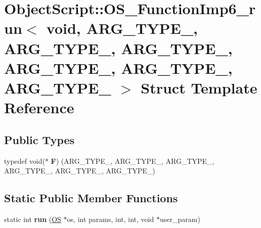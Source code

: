 \hypertarget{struct_object_script_1_1_o_s___function_imp6__run_3_01void_00_01_01_01_a_r_g___t_y_p_e__1_00_01_ae89323aca01fc8cba70af9d77328527}{}\section{Object\+Script\+:\+:O\+S\+\_\+\+Function\+Imp6\+\_\+run$<$ void, A\+R\+G\+\_\+\+T\+Y\+P\+E\+\_, A\+R\+G\+\_\+\+T\+Y\+P\+E\+\_, A\+R\+G\+\_\+\+T\+Y\+P\+E\+\_, A\+R\+G\+\_\+\+T\+Y\+P\+E\+\_, A\+R\+G\+\_\+\+T\+Y\+P\+E\+\_, A\+R\+G\+\_\+\+T\+Y\+P\+E\+\_ $>$ Struct Template Reference}
\label{struct_object_script_1_1_o_s___function_imp6__run_3_01void_00_01_01_01_a_r_g___t_y_p_e__1_00_01_ae89323aca01fc8cba70af9d77328527}
\subsection*{Public Types}
\begin{DoxyCompactItemize}
\item 
typedef void($\ast$ {\bfseries F}) (A\+R\+G\+\_\+\+T\+Y\+P\+E\+\_, A\+R\+G\+\_\+\+T\+Y\+P\+E\+\_, A\+R\+G\+\_\+\+T\+Y\+P\+E\+\_, A\+R\+G\+\_\+\+T\+Y\+P\+E\+\_, A\+R\+G\+\_\+\+T\+Y\+P\+E\+\_, A\+R\+G\+\_\+\+T\+Y\+P\+E\+\_)\hypertarget{struct_object_script_1_1_o_s___function_imp6__run_3_01void_00_01_01_01_a_r_g___t_y_p_e__1_00_01_ae89323aca01fc8cba70af9d77328527_a50fa858eb11daba849f6c61a71448367}{}\label{struct_object_script_1_1_o_s___function_imp6__run_3_01void_00_01_01_01_a_r_g___t_y_p_e__1_00_01_ae89323aca01fc8cba70af9d77328527_a50fa858eb11daba849f6c61a71448367}

\end{DoxyCompactItemize}
\subsection*{Static Public Member Functions}
\begin{DoxyCompactItemize}
\item 
static int {\bfseries run} (\hyperlink{class_object_script_1_1_o_s}{OS} $\ast$os, int params, int, int, void $\ast$user\+\_\+param)\hypertarget{struct_object_script_1_1_o_s___function_imp6__run_3_01void_00_01_01_01_a_r_g___t_y_p_e__1_00_01_ae89323aca01fc8cba70af9d77328527_a53a112e88e790485cdb728fa4cbc12a7}{}\label{struct_object_script_1_1_o_s___function_imp6__run_3_01void_00_01_01_01_a_r_g___t_y_p_e__1_00_01_ae89323aca01fc8cba70af9d77328527_a53a112e88e790485cdb728fa4cbc12a7}

\end{DoxyCompactItemize}


